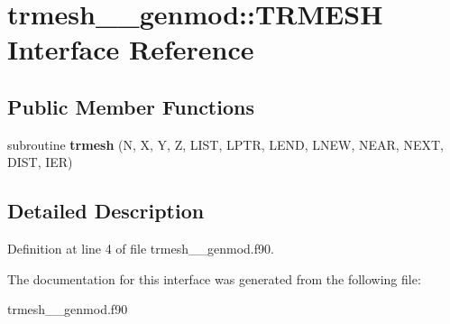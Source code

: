 \hypertarget{interfacetrmesh____genmod_1_1_t_r_m_e_s_h}{\section{trmesh\+\_\+\+\_\+genmod\+:\+:T\+R\+M\+E\+S\+H Interface Reference}
\label{interfacetrmesh____genmod_1_1_t_r_m_e_s_h}
}
\subsection*{Public Member Functions}
\begin{DoxyCompactItemize}
\item 
\hypertarget{interfacetrmesh____genmod_1_1_t_r_m_e_s_h_aebfe49c8c5c1876b6b027faa81d11271}{subroutine {\bfseries trmesh} (N, X, Y, Z, L\+I\+S\+T, L\+P\+T\+R, L\+E\+N\+D, L\+N\+E\+W, N\+E\+A\+R, N\+E\+X\+T, D\+I\+S\+T, I\+E\+R)}\label{interfacetrmesh____genmod_1_1_t_r_m_e_s_h_aebfe49c8c5c1876b6b027faa81d11271}

\end{DoxyCompactItemize}


\subsection{Detailed Description}


Definition at line 4 of file trmesh\+\_\+\+\_\+genmod.\+f90.



The documentation for this interface was generated from the following file\+:\begin{DoxyCompactItemize}
\item 
trmesh\+\_\+\+\_\+genmod.\+f90\end{DoxyCompactItemize}
